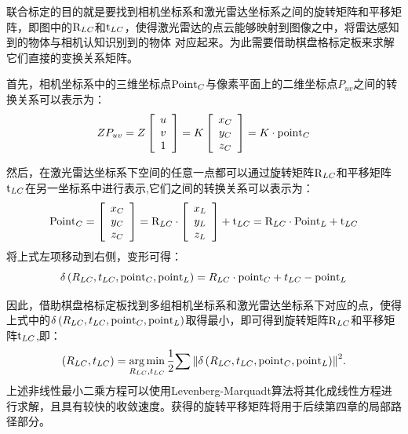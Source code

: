 联合标定的目的就是要找到相机坐标系和激光雷达坐标系之间的旋转矩阵和平移矩阵，即图中的${\rm{R}}_{LC}$和${\rm{t}}_{LC}$，使得激光雷达的点云能够映射到图像之中，将雷达感知到的物体与相机认知识别到的物体 对应起来。为此需要借助棋盘格标定板来求解它们直接的变换关系矩阵。

首先，相机坐标系中的三维坐标点${\rm{Poin}}{{\rm{t}}_C}$与像素平面上的二维坐标点${P_{uv}}$之间的转换关系可以表示为：
\begin{equation}
Z{P_{uv}} = Z\left[ {\begin{array}{*{20}{c}}
u\\
v\\
1
\end{array}} \right] = K\left[ {\begin{array}{*{20}{c}}
{{x_C}}\\
{{y_C}}\\
{{z_C}}
\end{array}} \right] = K \cdot {\rm{poin}}{{\rm{t}}_C}
    \label{myeq1}
\end{equation}

然后，在激光雷达坐标系下空间的任意一点都可以通过旋转矩阵${\rm{R}}_{LC}$和平移矩阵${\rm{t}}_{LC}$在另一坐标系中进行表示,它们之间的转换关系可以表示为：
\begin{equation}
{\rm{Poin}}{{\rm{t}}_C} = \left[ {\begin{array}{*{20}{c}}
{{x_C}}\\
{{y_C}}\\
{{z_C}}
\end{array}} \right] = {{\rm{R}}_{LC}} \cdot \left[ {\begin{array}{*{20}{c}}
{{x_L}}\\
{{y_L}}\\
{{z_L}}
\end{array}} \right] + {{\rm{t}}_{LC}} = {{\rm{R}}_{LC}} \cdot {\rm{Poin}}{{\rm{t}}_L} + {{\rm{t}}_{LC}} 
    \label{myeq2}
\end{equation}
将上式左项移动到右侧，变形可得：
\begin{equation}
    \delta \left( {{R_{LC}},{t_{LC}},{\rm{poin}}{{\rm{t}}_C},{\rm{poin}}{{\rm{t}}_L}} \right) = {R_{LC}} \cdot {\rm{poin}}{{\rm{t}}_C} + {t_{LC}} - {\rm{poin}}{{\rm{t}}_L}
    \label{myeq3}
\end{equation}

因此，借助棋盘格标定板找到多组相机坐标系和激光雷达坐标系下对应的点，使得上式中的$\delta \left( {{R_{LC}},{t_{LC}},{\rm{poin}}{{\rm{t}}_C},{\rm{poin}}{{\rm{t}}_L}} \right)$取得最小，即可得到旋转矩阵${\rm{R}}_{LC}$和平移矩阵${\rm{t}}_{LC}$,即：
\begin{equation}
    \left( {{R_{LC}},{t_{LC}}} \right) = \mathop {\arg \min }\limits_{{R_{LC}},{t_{LC}}} \frac{1}{2}{\sum {\left\| {\delta \left( {{R_{LC}},{t_{LC}},{\rm{poin}}{{\rm{t}}_C},{\rm{poin}}{{\rm{t}}_L}} \right)} \right\|} ^2}.
    \label{myeq4}
\end{equation}
上述非线性最小二乘方程可以使用Levenberg-Marquadt算法\cite{more1977levenberg}将其化成线性方程进行求解，且具有较快的收敛速度。获得的旋转平移矩阵将用于后续第四章的局部路径部分。



